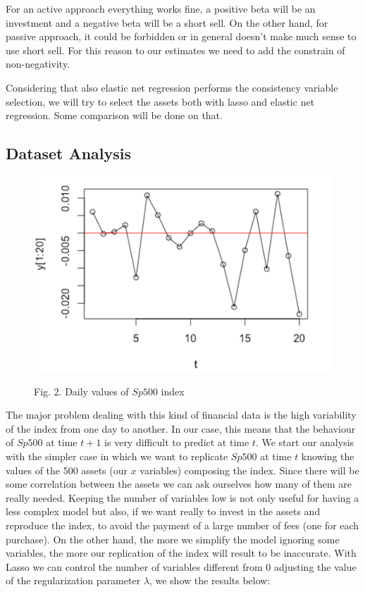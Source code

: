 \documentclass{article}%
\begin{document}
For an active approach everything works fine, a positive beta will be an investment and a negative beta will be a short sell. On the other hand, for passive approach, it could be forbidden or in general doesn't make much sense to use short sell. For this reason to our estimates we need to add the constrain of non-negativity.

Considering that also elastic net regression performs the consistency variable selection, we will try to select the assets both with lasso and elastic net regression. Some comparison will be done on that.

\subsection{Dataset Analysis}
\begin{figure}[h!!!]
  \centering
  \includegraphics[scale=0.45]{daily_var.png}
  \begin{center}
\begin{small}
Fig. 2. Daily values of $Sp500$ index
\end{small}
\end{center}

  \label{daily_var}
\end{figure}

The major problem dealing with this kind of financial data is the high variability of the index from one day to another. In our case, this means that the behaviour of  $Sp500$ at time $t+1$ is very difficult to predict at time $t$.
We start our analysis with the simpler case in which we want to replicate $Sp500$ at time $t$ knowing the values of the $500$ assets (our $x$ variables) composing the index. Since there will be some correlation between the assets we can ask ourselves how many of them are really needed. Keeping the number of variables low is not only useful for having a less complex model but also, if we want really to invest in the assets and reproduce the index, to avoid the payment of a large number of fees (one for each purchase). On the other hand, the more we simplify the model ignoring some variables, the more our replication of the index will result to be inaccurate. With Lasso we can control the number of variables different from $0$ adjusting the value of the regularization parameter $\lambda$, we show the results below: 
\end{document}
